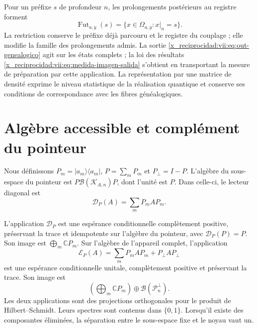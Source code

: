 Pour un préfixe \(s\) de profondeur \(n\), les prolongements postérieurs
au registre forment
\[
 \operatorname{Fut}_{a,y}(s)
 =\{x\in\Omega_{a,y}:x|_n=s\}.
\]
La restriction conserve le préfixe déjà parcouru et le registre du
couplage ; elle modifie la famille des prolongements admis. La sortie
\eqref{x_reciprocidad:vii:eq:out-genealogico} agit sur les états complets ; la loi des
résultats \eqref{x_reciprocidad:vii:eq:medida-imagen-salida} s’obtient en transportant
la mesure de préparation par cette application. La représentation par une
matrice de densité exprime le niveau
statistique de la réalisation quantique et conserve ses conditions de
correspondance avec les fibres généalogiques.



\section{Algèbre accessible et complément du pointeur}
\label{x_reciprocidad:vii:sec:observador-expectativa}

Nous définissons \(P_m=|a_m\rangle\langle a_m|\), \(P=\sum_mP_m\) et \(P_\perp=I-P\). L'algèbre du sous-espace du pointeur est \(P\mathcal B(\mathcal K_{A,n})P\), dont l'unité est \(P\). Dans celle-ci, le lecteur diagonal est
\[
 \mathcal D_P(A)=\sum_mP_mAP_m.
\]

\begin{proposition}
\label{x_reciprocidad:vii:prop:observador-pinzamiento}
L'application \(\mathcal D_P\) est une espérance conditionnelle complètement positive, préservant la trace et idempotente sur l'algèbre du pointeur, avec \(\mathcal D_P(P)=P\). Son image est \(\bigoplus_m\mathbb CP_m\). Sur l'algèbre de l'appareil complet, l'application
\begin{equation}
 \mathcal E_P(A)=\sum_mP_mAP_m+P_\perp AP_\perp
 \label{x_reciprocidad:vii:eq:observador-complemento}
\end{equation}
est une espérance conditionnelle unitale, complètement positive et
préservant la trace. Son image est
\[
 \left(\bigoplus_m\mathbb CP_m\right)
 \oplus\mathcal B(\mathcal P_n^\perp).
\]
Les deux applications sont des projections orthogonales pour le produit de
Hilbert--Schmidt. Leurs spectres sont contenus dans \(\{0,1\}\).
Lorsqu'il existe des composantes éliminées, la séparation entre le
sous-espace fixe et le noyau vaut un.
\end{proposition}


